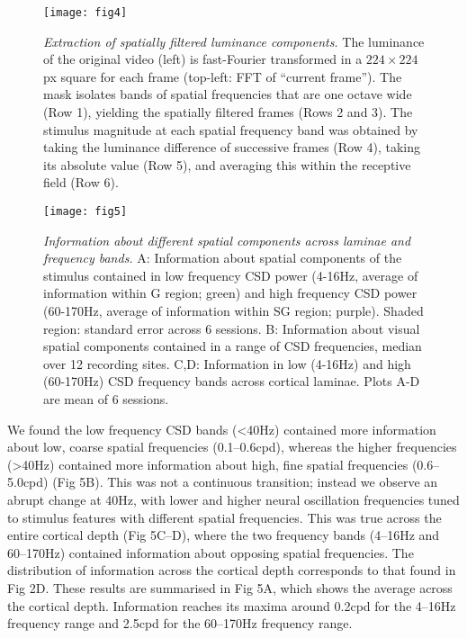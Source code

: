 \begin{figure}[htbp]
\centering \texttt{[image: fig4]}
%
\caption{%
\textit{Extraction of spatially filtered luminance components.}
The luminance of the original video (left) is 
fast-Fourier transformed in a $224 \times 224$ px square for each frame (top-left: \ac{FFT} of 
``current frame'').
The mask isolates bands of spatial frequencies that are one octave wide (Row 1), yielding 
the spatially filtered frames (Rows 2 and 3).
The stimulus magnitude at each spatial frequency band was obtained 
by taking the luminance difference of successive frames (Row 4), 
taking its absolute value (Row 5), 
and averaging this within the receptive field (Row 6).
}%
\label{fig:lam_4}
%
\end{figure}

\begin{figure}[htbp]
\centering \texttt{[image: fig5]}
%
\caption{%
\textit{Information about different spatial components across laminae and frequency bands.}
A: Information about spatial components of the stimulus contained in 
low frequency \ac{CSD} power (4-16Hz, average of information within \ac{G} region; green) and high 
frequency \ac{CSD} power (60-170Hz, average of information within \ac{SG} region; purple). Shaded region: standard error across 6 sessions.
B: Information about visual spatial components contained in a range of \ac{CSD} frequencies, median over 12 recording sites.
C,D: Information in low (4-16Hz) and high (60-170Hz) 
\ac{CSD} frequency bands across cortical laminae.
Plots A-D are mean of 6 sessions.}%
\label{fig:lam_5}
%
\end{figure}

We found the low frequency \ac{CSD} bands ({\textless}40Hz) contained more information about low, coarse spatial frequencies (0.1--0.6cpd), whereas the higher frequencies ({\textgreater}40Hz) contained more information about high, fine spatial frequencies (0.6--5.0cpd) (Fig 5B). This was not a continuous transition; instead we observe an abrupt change at 40Hz, with lower and higher neural oscillation frequencies tuned to stimulus features with different spatial frequencies. This was true across the entire cortical depth (Fig 5C--D), where the two frequency bands (4--16Hz and 60--170Hz) contained information about opposing spatial frequencies. The distribution of information across the cortical depth corresponds to that found in Fig 2D. These results are summarised in Fig 5A, which shows the average across the cortical depth. Information reaches its maxima around 0.2cpd for the 4--16Hz frequency range and 2.5cpd for the 60--170Hz frequency range.


